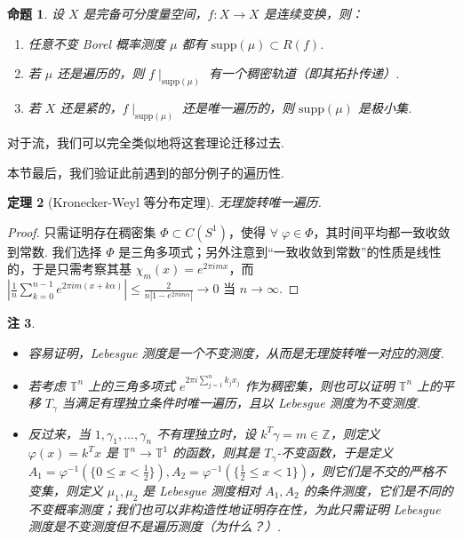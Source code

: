 \documentclass[11pt, a4paper, oneside]{ctexart}
\newtheorem{theorem}{定理}[section]
\newtheorem{proposition}[theorem]{命题}
\newtheorem{remark}[theorem]{注}
\newcommand{\T}{\mathbb{T}}
\newcommand{\Z}{\mathbb{Z}}
\newcommand{\supp}{\mathrm{supp}}
\newcommand{\abs}[1]{\left|{#1}\right|}
\begin{document}
    \begin{proposition}
        设 $X$ 是完备可分度量空间，$f:X\to X$ 是连续变换，则：
        \begin{enumerate}
            \item 任意不变 Borel 概率测度 $\mu$ 都有 $\supp(\mu)\subset R(f)$.
            \item 若 $\mu$ 还是遍历的，则 $f\mid_{\supp(\mu)}$ 有一个稠密轨道（即其拓扑传递）.
            \item 若 $X$ 还是紧的，$f\mid_{\supp(\mu)}$ 还是唯一遍历的，则 $\supp(\mu)$ 是极小集.
        \end{enumerate}
    \end{proposition}

    对于流，我们可以完全类似地将这套理论迁移过去.

    本节最后，我们验证此前遇到的部分例子的遍历性.

    \begin{theorem}[Kronecker-Weyl 等分布定理]
        无理旋转唯一遍历.
    \end{theorem}
    \begin{proof}
        只需证明存在稠密集 $\Phi\subset C(S^1)$，使得 $\forall\; \varphi\in \Phi$，其时间平均都一致收敛到常数. 我们选择 $\Phi$ 是三角多项式；另外注意到“一致收敛到常数”的性质是线性的，于是只需考察其基 $\chi_m(x)=e^{2\pi imx}$，而 $\abs{\frac{1}{n}\sum\limits_{k=0}^{n-1}e^{2\pi im(x+k\alpha)}}\leq \frac{2}{n\abs{1-e^{2\pi im\alpha}}}\to 0$ 当 $n\to\infty$.
    \end{proof}
    \begin{remark}
        \begin{itemize}
            \item 容易证明，Lebesgue 测度是一个不变测度，从而是无理旋转唯一对应的测度.
            \item 若考虑 $\T^n$ 上的三角多项式 $e^{2\pi i\sum\limits_{j=1}^{n}k_j x_j}$ 作为稠密集，则也可以证明 $\T^n$ 上的平移 $T_{\gamma}$ 当满足有理独立条件时唯一遍历，且以 Lebesgue 测度为不变测度.
            \item 反过来，当 $1,\gamma_1,\ldots,\gamma_n$ 不有理独立时，设 $k^T\gamma=m\in\Z$，则定义 $\varphi(x)=k^T x$ 是 $\T^n\to \T^1$ 的函数，则其是 $T_{\gamma}$-不变函数，于是定义 $A_1=\varphi^{-1}(\{0\leq x<\frac{1}{2}\}),A_2=\varphi^{-1}(\{\frac{1}{2}\leq x<1\})$，则它们是不交的严格不变集，则定义 $\mu_1,\mu_2$ 是 Lebesgue 测度相对 $A_1,A_2$ 的条件测度，它们是不同的不变概率测度；我们也可以非构造性地证明存在性，为此只需证明 Lebesgue 测度是不变测度但不是遍历测度（为什么？）.
        \end{itemize}
    \end{remark}
\end{document}
